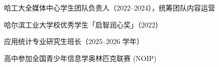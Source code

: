 \item 哈工大全媒体中心学生团队负责人（2022--2024），统筹团队内容运营
\item 哈尔滨工业大学校优秀学生「启智润心奖」（2022）
\item 应用统计专业研究生班长（2025--2026 学年）
\item 高中参加全国青少年信息学奥林匹克联赛 (NOIP)
